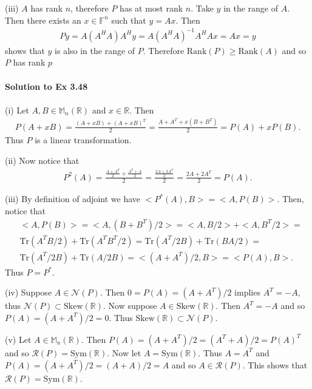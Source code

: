 \documentclass[letterpaper,12pt]{article}
\theoremstyle{definition}
\begin{document}
\begin{spacing}{1.3}{}
	(iii)
	$A$ has rank $n$, therefore $P$ has at most rank $n$.
	Take $y$ in the range of $A$.
	Then there exists an $x\in\mathbb F^n$ such that $y=Ax$.
	Then
	\begin{align*}
	Py=A(A^HA)A^Hy=A(A^HA)^{-1}A^HAx=Ax=y
	\end{align*}
	shows that $y$ is also in the range of $P$.
	Therefore $\text{Rank}(P)\geq\text{Rank}(A)$ and so $P$ has rank $p$ \\\\
	
	\textbf{Solution to Ex 3.48} \\\\
	(i)
	Let $A,B\in\mathbb M_n(\mathbb R)$ and $x\in\mathbb R$.
	Then
	\begin{align*}
	P(A+xB)=\frac{(A+xB)+(A+xB)^T}{2}=
	\frac{A+A^T+x(B+B^T)}{2}=P(A)+xP(B).
	\end{align*}
	Thus $P$ is a linear transformation.
	
	(ii)
	Now notice that
	\begin{align*}
	P^2(A)=\frac{\frac{A+A^T}{2}+\frac{A^T+A}{2}}{2}=
	\frac{\frac{2A+2A^T}{2}}{2}=\frac{2A+2A^T}{2}=P(A).
	\end{align*}
	
	(iii)
	By definition of adjoint we have $<P^*(A),B>=<A,P(B)>$.
	Then, notice that
	\begin{align*}
	&<A,P(B)>=<A,(B+B^T)/2>=
	<A,B/2>+<A,B^T/2>=\\
	&\text{Tr}(A^TB/2)+\text{Tr}(A^TB^T/2)=
	\text{Tr}(A^T/2B)+\text{Tr}(BA/2)=\\
	&\text{Tr}(A^T/2B)+\text{Tr}(A/2B)=
	<(A+A^T)/2,B>=<P(A),B>.
	\end{align*}
	Thus $P=P^*$.
	
	(iv)
	Suppose $A\in\mathcal N(P)$.
	Then $0=P(A)=(A+A^T)/2$ implies $A^T=-A$, thus $\mathcal N(P)\subset\text{Skew}(\mathbb R)$.
	Now suppose $A\in\text{Skew}(\mathbb R)$.
	Then $A^T=-A$ and so $P(A)=(A+A^T)/2=0$. Thus $\text{Skew}(\mathbb R)\subset\mathcal N(P)$.
	
	(v)
	Let $A\in\mathbb M_n(\mathbb R)$.
	Then $P(A)=(A+A^T)/2=(A^T+A)/2=P(A)^T$ and so $\mathcal R(P)=\text{Sym}(\mathbb R)$.
	Now let $A=\text{Sym}(\mathbb R)$.
	Thus $A=A^T$ and $P(A)=(A+A^T)/2=(A+A)/2=A$ and so $A\in\mathcal R(P)$.
	This shows that $\mathcal R(P)=\text{Sym}(\mathbb R)$.
	

\end{spacing}
\end{document}
